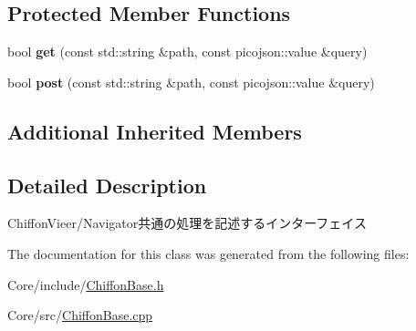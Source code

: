 \subsection*{Protected Member Functions}
\begin{DoxyCompactItemize}
\item 
\hypertarget{classskl_1_1_chiffon_base_aac461d11065188b07c1c3aa73ef70368}{}\label{classskl_1_1_chiffon_base_aac461d11065188b07c1c3aa73ef70368} 
bool {\bfseries get} (const std\+::string \&path, const picojson\+::value \&query)
\item 
\hypertarget{classskl_1_1_chiffon_base_aad2939076444319328aff4e3b71e2a46}{}\label{classskl_1_1_chiffon_base_aad2939076444319328aff4e3b71e2a46} 
bool {\bfseries post} (const std\+::string \&path, const picojson\+::value \&query)
\end{DoxyCompactItemize}
\subsection*{Additional Inherited Members}


\subsection{Detailed Description}
Chiffon\+Vieer/\+Navigator共通の処理を記述するインターフェイス　 

The documentation for this class was generated from the following files\+:\begin{DoxyCompactItemize}
\item 
Core/include/\hyperlink{_chiffon_base_8h}{Chiffon\+Base.\+h}\item 
Core/src/\hyperlink{_chiffon_base_8cpp}{Chiffon\+Base.\+cpp}\end{DoxyCompactItemize}

